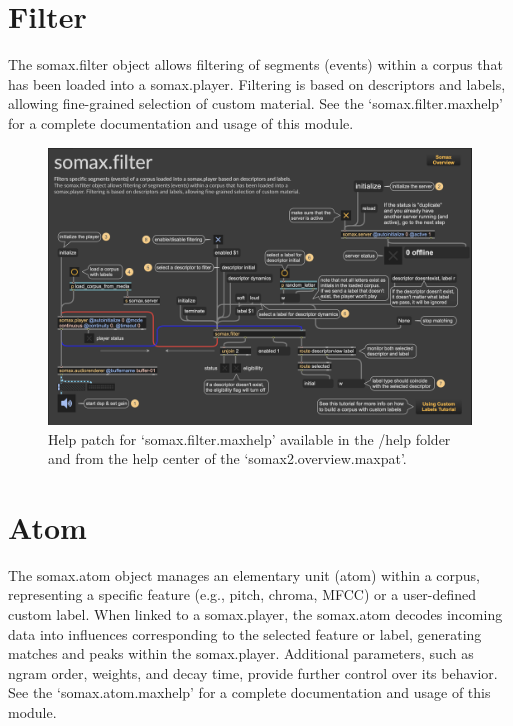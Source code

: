 \section{Filter}
The somax.filter object allows filtering of segments (events) within a corpus that has been loaded into a somax.player. Filtering is based on descriptors and labels, allowing fine-grained selection of custom material.
See the `somax.filter.maxhelp' for a complete documentation and usage of this module.

\begin{figure}[H]
    \centering        
 	\includegraphics[width=1\textwidth, keepaspectratio]{img/filter_help.png}
    \caption{Help patch for `somax.filter.maxhelp' available in the /help folder and from the help center of the `somax2.overview.maxpat'.}
    \label{fig:filter_help}
\end{figure}

\section{Atom}

The somax.atom object manages an elementary unit (atom) within a corpus, representing a specific feature (e.g., pitch, chroma, MFCC) or a user-defined custom label. When linked to a somax.player, the somax.atom decodes incoming data into influences corresponding to the selected feature or label, generating matches and peaks within the somax.player. Additional parameters, such as ngram order, weights, and decay time, provide further control over its behavior.
See the `somax.atom.maxhelp' for a complete documentation and usage of this module.

